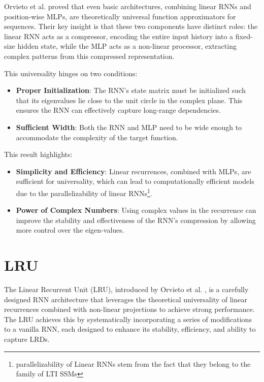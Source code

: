 \documentclass[12pt,a4paper]{report}
\begin{document}
Orvieto et al. \cite{universality_lrnn} proved that even basic architectures, combining linear RNNs and position-wise MLPs, are theoretically universal function approximators for sequences. Their key insight is that these two components have distinct roles: the linear RNN acts as a compressor, encoding the entire input history into a fixed-size hidden state, while the MLP acts as a non-linear processor, extracting complex patterns from this compressed representation.

\medskip

This universality hinges on two conditions:
\begin{itemize}
    \item \textbf{Proper Initialization}: The RNN's state matrix must be initialized such that its eigenvalues lie close to the unit circle in the complex plane. This ensures the RNN can effectively capture long-range dependencies.
    \item \textbf{Sufficient Width}: Both the RNN and MLP need to be wide enough to accommodate the complexity of the target function.
\end{itemize}

This result highlights:
\begin{itemize}
    \item \textbf{Simplicity and Efficiency}: Linear recurrences, combined with MLPs, are sufficient for universality, which can lead to computationally efficient models due to the parallelizability of linear RNNs\footnote{parallelizability of Linear RNNs stem from the fact that they belong to the family of LTI SSMs}.
    \item \textbf{Power of Complex Numbers}: Using complex values in the recurrence can improve the stability and effectiveness of the RNN's compression by allowing more control over the eigen-values.
\end{itemize}

\section{LRU}

The Linear Recurrent Unit (LRU), introduced by Orvieto et al. \cite{lru}, is a carefully designed RNN architecture that leverages the theoretical universality of linear recurrences combined with non-linear projections to achieve strong performance. The LRU achieves this by systematically incorporating a series of modifications to a vanilla RNN, each designed to enhance its stability, efficiency, and ability to capture LRDs.
\end{document}
